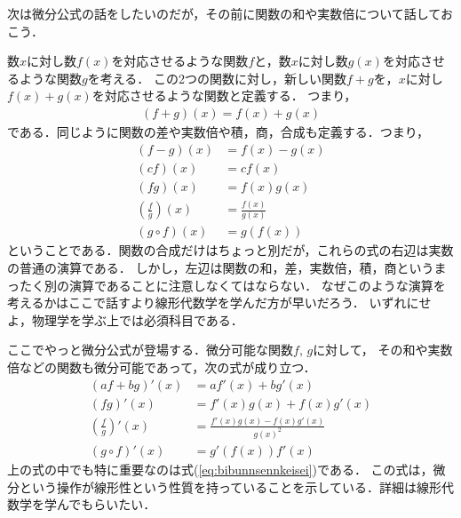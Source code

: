 次は微分公式の話をしたいのだが，その前に関数の和や実数倍について話しておこう．

数$x$に対し数$f(x)$を対応させるような関数$f$と，数$x$に対し数$g(x)$を対応させるような関数$g$を考える．
この2つの関数に対し，新しい関数$f+g$を，$x$に対し$f(x)+g(x)$を対応させるような関数と定義する．
つまり，
\begin{align}
(f+g)(x) = f(x)+g(x)
\label{eq:kannsuuwa}
\end{align}
である．同じように関数の差や実数倍や積，商，合成も定義する．つまり，
\begin{align}
(f-g)(x) & = f(x) - g(x)
\label{eq:kannsuusa} \\
(cf)(x) & = cf(x)
\label{eq:kannsuujisuubai} \\
(fg)(x) & = f(x)g(x)
\label{eq:kannsuuseki} \\
\left( \frac{f}{g} \right) (x) & = \frac{f(x)}{g(x)} 
\label{eq:kannsuusyou} \\
( g \circ f) (x) & = g( f(x))
\label{eq:kansuugousei}
\end{align}
ということである．関数の合成だけはちょっと別だが，これらの式の右辺は実数の普通の演算である．
しかし，左辺は関数の和，差，実数倍，積，商というまったく別の演算であることに注意しなくてはならない．
なぜこのような演算を考えるかはここで話すより線形代数学を学んだ方が早いだろう．
いずれにせよ，物理学を学ぶ上では必須科目である．

ここでやっと微分公式が登場する．微分可能な関数$f, \, g$に対して，
その和や実数倍などの関数も微分可能であって，次の式が成り立つ．
\begin{align}
(af + bg)'(x) & = af'(x) + bg'(x)
\label{eq:bibunnsennkeisei} \\
(fg)'(x) & = f'(x)g(x) + f(x)g'(x) 
\label{eq:sekibibunn} \\
\left( \frac{f}{g} \right)'(x) & = \frac{f'(x)g(x) - f(x)g'(x)}{g(x)^2}
\label{eq:syoubibunn} \\
(g \circ f )' (x) & = g' \left( f(x) \right) f'(x)
\label{eq:gouseikannsuubibunn}
\end{align}
上の式の中でも特に重要なのは式(\ref{eq:bibunnsennkeisei})である．
この式は，微分という操作が線形性という性質を持っていることを示している．詳細は線形代数学を学んでもらいたい．

